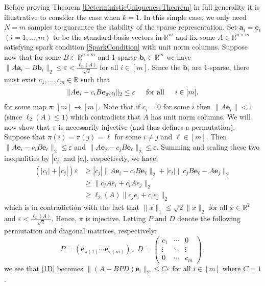 \documentclass[journal, onecolumn]{IEEEtran}
\begin{document}
Before proving Theorem \ref{DeterministicUniquenessTheorem} in full generality it is illustrative to consider the case when $k=1$. In this simple case, we only need $N = m$ samples to guarantee the stability of the sparse representation. Set $\mathbf{a}_i = \mathbf{e}_i$ $(i = 1, \ldots, m)$ to be the standard basis vectors in $\mathbb{R}^m$ and fix some $A \in \mathbb{R}^{n \times m}$ satisfying spark condition \eqref{SparkCondition} with unit norm columns. Suppose now that for some $B \in \mathbb{R}^{n \times m}$ and 1-sparse $\mathbf{b}_i \in \mathbb{R}^m$ we have  $\|A\mathbf{a}_i - B\mathbf{b}_i\|_2 \leq \varepsilon < \frac{\ell_2(A)}{\sqrt{2}}$ for all $i \in [m]$. Since the $\mathbf{b}_i$ are 1-sparse, there must exist $c_1, \ldots, c_m \in \mathbb{R}$ such that 
\begin{align}\label{1D}
\|A\mathbf{e}_i - c_iB\mathbf{e}_{\pi(i)}\|_2 \leq \varepsilon \indent \text{for all} \indent i \in [m].
\end{align}
for some map $\pi: [m] \to [m]$. 
Note that if $c_i = 0$ for some $i$ then $\|A\mathbf{e}_i\| < 1$ (since $\ell_2(A) \leq 1$) which contradicts that $A$ has unit norm columns. We will now show that $\pi$ is necessarily injective (and thus defines a permutation). Suppose that $\pi(i) = \pi(j) = \ell$ for some $i \neq j$ and $\ell \in [m]$. Then $\|A\mathbf{e}_i - c_iB\mathbf{e}_{\ell}\|_2  \leq \varepsilon$ and $\|A\mathbf{e}_j - c_jB\mathbf{e}_{\ell}\|_2 \leq \varepsilon$. Summing and scaling these two inequalities by $|c_j|$ and $|c_i|$, respectively, we have:
\begin{align*}
(|c_i| + |c_j|) \varepsilon
&\geq |c_j|\|A\mathbf{e}_i - c_iB\mathbf{e}_{\ell}\|_2 + |c_i|\|c_jB\mathbf{e}_{\ell} - A\mathbf{e}_j\|_2 \\
&\geq \|c_jAe_i + c_iAe_j\|_2 \\
&\geq \ell_2(A)\|c_je_i + c_ie_j\|_2
\end{align*}
%
which is in contradiction with the fact that $\|x\|_1 \leq \sqrt{2}\|x\|_2$ for all $x \in \mathbb{R}^2$ and $\varepsilon < \frac{\ell_2(A)}{\sqrt{2}}$. Hence, $\pi$ is injective. Letting $P$ and $D$ denote the following permutation and diagonal matrices, respectively:
\begin{equation}\label{PandD}
P = \left( \mathbf{e}_{\pi(1)} \cdots \mathbf{e}_{\pi(m)}\right), \ \ D = \left(\begin{array}{ccc}c_1 & \cdots & 0 \\\vdots & \ddots & \vdots \\0 & \cdots & c_m\end{array}\right),
\end{equation}
%
we see that \eqref{1D} becomes $\|(A - BPD)\mathbf{e}_i\|_2 \leq C\varepsilon$ for all $i \in [m]$ where $C=1$. 
\end{document}
